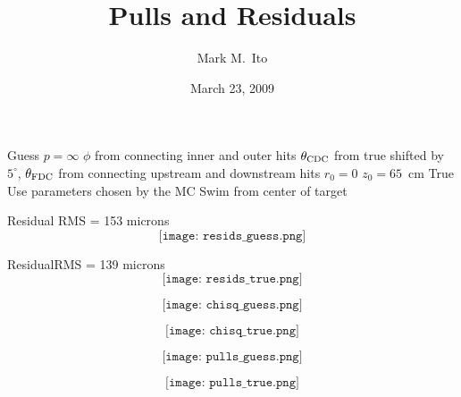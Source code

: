 \documentclass[xcolor=dvipsnames]{beamer}
\begin{document}
\title{Pulls and Residuals}
\author[M.\ Ito]{Mark M.\ Ito}
\date{March 23, 2009}

\f{
\be
\I Guess
\bi
\I $p = \infty$
\I $\phi$ from connecting inner and outer hits
\I $\theta_{\rm CDC}$ from true shifted by $5^\circ$, $\theta_{\rm FDC}$ from connecting upstream and downstream hits
\I $r_0 = 0$
\I $z_0 = 65$~cm
\ei
\I True
\bi
\I Use parameters chosen by the MC
\I Swim from center of target
\ei
\ee
}

\f{
Residual RMS = 153 microns
$$
\texttt{[image: resids\_guess.png]}
$$
}

\f{
ResidualRMS = 139 microns
$$
\texttt{[image: resids\_true.png]}
$$
}

\f{
$$
\texttt{[image: chisq\_guess.png]}
$$
}

\f{
$$
\texttt{[image: chisq\_true.png]}
$$
}

\f{
$$
\texttt{[image: pulls\_guess.png]}
$$
}

\f{
$$
\texttt{[image: pulls\_true.png]}
$$
}
\end{document}
